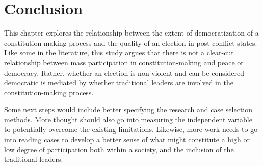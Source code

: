 \documentclass [11pt]{article}
\begin{document}
\section*{Conclusion}

This chapter explores the relationship between the extent of democratization of a constitution-making process and the quality of an election in post-conflict states. Like some in the literature, this study argues that there is not a clear-cut relationship between mass participation in constitution-making and peace or democracy. Rather, whether an election is non-violent and can be considered democratic is mediated by whether traditional leaders are involved in the constitution-making process.

Some next steps would include better specifying the research and case selection methods. More thought should also go into measuring the independent variable to potentially overcome the existing limitations. Likewise, more work needs to go into reading cases to develop a better sense of what might constitute a high or low degree of participation both within a society, and the inclusion of the traditional leaders.
\end{document}
